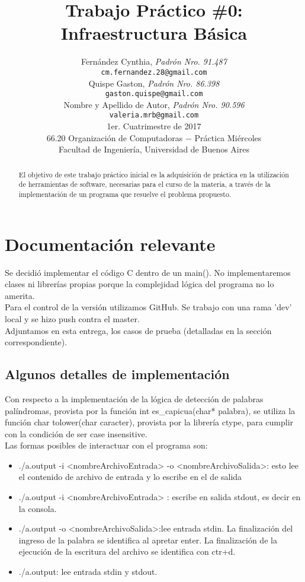 \documentclass[a4paper,10pt]{article}
\title{	\textbf{Trabajo Pr\'actico \#0: Infraestructura B\'asica}}
\author{
	Fern\'andez Cynthia, \textit{Padr\'on Nro. 91.487}               \\
	\texttt{ cm.fernandez.28@gmail.com }                             \\[2.5ex]
	Quispe Gaston, \textit{Padr\'on Nro. 86.398}                     \\
	\texttt{ gaston.quispe@gmail.com }                               \\[2.5ex]
	Nombre y Apellido de Autor, \textit{Padr\'on Nro. 90.596}        \\
	\texttt{ valeria.mrb@gmail.com }                                 \\[2.5ex]
	\normalsize{1er. Cuatrimestre de 2017}                           \\
	\normalsize{66.20 Organizaci\'on de Computadoras  $-$ Pr\'actica Mi\'ercoles} \\
	\normalsize{Facultad de Ingenier\'ia, Universidad de Buenos Aires}            \\
       }
\date{}
\begin{document}
\maketitle


\thispagestyle{empty}   %


\begin{abstract}
El objetivo de este trabajo pr\'actico inicial es la adquisici\'on de pr\'actica en la utilizaci\'on de herramientas de software, necesarias para el curso de la materia, a trav\'es de la implementaci\'on de un programa que resuelve el problema propuesto.
\end{abstract}

\tableofcontents

\section{Documentaci\'on relevante}

Se decidi\'o implementar el c\'odigo C dentro de un main(). No implementaremos clases ni librer\'ias propias porque la complejidad l\'ogica del programa no lo amerita.\\
Para el control de la versi\'on utilizamos GitHub. Se trabajo con una rama 'dev' local y se hizo push contra el master.\\
Adjuntamos en esta entrega, los casos de prueba (detalladas en la secci\'on correspondiente).\\


\subsection{Algunos detalles de implementaci\'on}

Con respecto a la implementaci\'on de la l\'ogica de detecci\'on de palabras pal\'indromas, provista por la funci\'on int es\_capicua(char* palabra), se utiliza la funci\'on char tolower(char caracter), provista por la librer\'ia ctype, para cumplir con la condici\'on de ser case insensitive.\\
Las formas posibles de interactuar con el programa son:\\
\begin{itemize}
	\item ./a.output -i <nombreArchivoEntrada> -o <nombreArchivoSalida>: esto lee el contenido de archivo de entrada y lo escribe en el de salida
	\item ./a.output -i <nombreArchivoEntrada> : escribe en salida stdout, es decir en la consola.
	\item ./a.output -o <nombreArchivoSalida>:lee entrada stdin. La finalizaci\'on del ingreso de la palabra se identifica al apretar enter. La finalizaci\'on de la ejecuci\'on de la escritura del archivo se identifica con ctr+d.
	\item ./a.output: lee entrada stdin y stdout.
\end{itemize}
\end{document}
